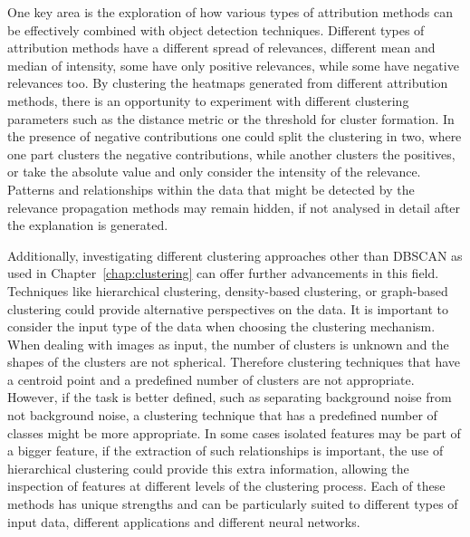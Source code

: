 One key area is the exploration of how various types of attribution methods can be effectively combined with object detection techniques. Different types of attribution methods have a different spread of relevances, different mean and median of intensity, some have only positive relevances, while some have negative relevances too. By clustering the heatmaps generated from different attribution methods, there is an opportunity to experiment with different clustering parameters such as the distance metric or the threshold for cluster formation. In the presence of negative contributions one could split the clustering in two, where one part clusters the negative contributions, while another clusters the positives, or take the absolute value and only consider the intensity of the relevance. Patterns and relationships within the data that might be detected by the relevance propagation methods may remain hidden, if not analysed in detail after the explanation is generated. 

Additionally, investigating different clustering approaches other than DBSCAN as used in Chapter~\ref{chap:clustering} can offer further advancements in this field. Techniques like hierarchical clustering, density-based clustering, or graph-based clustering could provide alternative perspectives on the data. It is important to consider the input type of the data when choosing the clustering mechanism. When dealing with images as input, the number of clusters is unknown and the shapes of the clusters are not spherical. Therefore clustering techniques that have a centroid point and a predefined number of clusters are not appropriate. However, if the task is better defined, such as separating background noise from not background noise, a clustering technique that has a predefined number of classes might be more appropriate. In some cases isolated features may be part of a bigger feature, if the extraction of such relationships is important, the use of hierarchical clustering could provide this extra information, allowing the inspection of features at different levels of the clustering process. Each of these methods has unique strengths and can be particularly suited to different types of input data, different applications and different neural networks.

